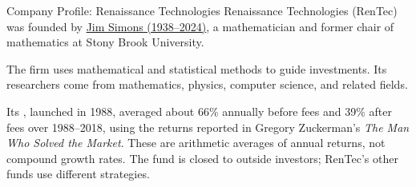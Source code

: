 \documentclass[aspectratio=169,11pt]{beamer}
\begin{document}
\begin{frame}{Company Profile: Renaissance Technologies}
Renaissance Technologies (RenTec) was founded by
\href{https://www.simonsfoundation.org/2024/05/10/simons-foundation-co-founder-mathematician-and-investor-jim-simons-dies-at-86/}{Jim Simons (1938--2024)},
a mathematician and former chair of mathematics at Stony Brook University.

\vspace{0.7em}
The firm uses mathematical and statistical methods to guide investments.
Its researchers come from mathematics, physics, computer science, and
related fields.

\vspace{0.7em}
Its , launched in 1988, averaged about 66\% annually
before fees and 39\% after fees over 1988--2018, using the returns reported
in Gregory Zuckerman's \emph{The Man Who Solved the Market}. These are
arithmetic averages of annual returns, not compound growth rates. The fund
is closed to outside investors; RenTec's other funds use different strategies.
\end{frame}
\end{document}
